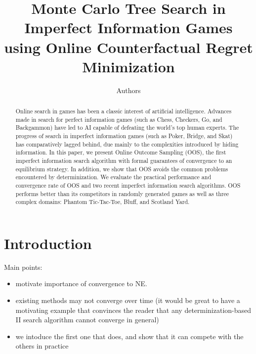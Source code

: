 \documentclass[letterpaper]{article}
\begin{document}
%
\title{Monte Carlo Tree Search in Imperfect Information Games\\using Online Counterfactual Regret Minimization}
\author{Authors}


\maketitle

\begin{abstract}
Online search in games has been a classic interest of artificial intelligence.
Advances made in search for perfect information games (such as Chess, Checkers, Go, and Backgammon) have led to AI capable of defeating the world's top human experts. 
The progress of search in imperfect information games (such as Poker, Bridge, and Skat) has comparatively lagged behind, due mainly to the complexities introduced by hiding information. 
In this paper, we present Online Outcome Sampling (OOS), the first imperfect information search algorithm with formal guarantees of convergence to an equilibrium strategy.   
In addition, we show that OOS avoids the common problems encountered by determinization.
We evaluate the practical performance and convergence rate of OOS and two recent imperfect information search algorithms. OOS performs better than its competitors in randomly generated games as well as three complex domains: Phantom Tic-Tac-Toe, Bluff, and Scotland Yard.  
\end{abstract}

\section{Introduction}

Main points: 
\begin{itemize}
\item motivate importance of convergence to NE. 
\item existing methods may not converge over time (it would be great to have a motivating example that convinces the reader that any determinization-based II search algorithm cannot converge in general)
\item we intoduce the first one that does, and show that it can compete with the others in practice
\end{itemize}
\end{document}
